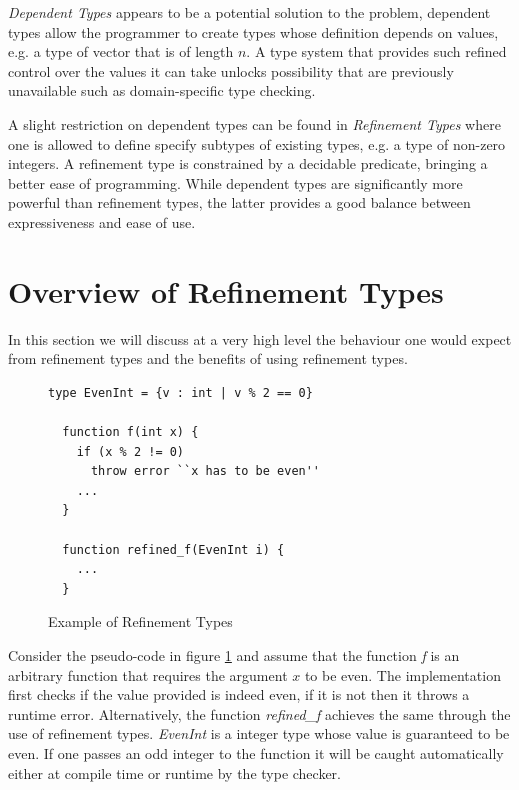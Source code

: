 \documentclass[a4paper,12pt]{report}
\begin{document}
\par
\textit{Dependent Types} \cite{depenTypeAtWork} appears to be a potential solution 
to the problem, dependent types allow the programmer to create types whose 
definition depends on values, e.g. a type of vector that is of length $n$. 
A type system that provides such refined control over the values it 
can take unlocks possibility that are previously unavailable such as 
domain-specific type checking.

\par
A slight restriction on dependent types can be found in \textit{Refinement 
Types} \cite{refinementTypes} where one is allowed to define specify subtypes 
of existing types, e.g. a type of non-zero integers. 
A refinement type is constrained by a decidable predicate, 
bringing a better ease of programming. While dependent types are significantly 
more powerful than refinement types, the latter provides a good balance between 
expressiveness and ease of use.

\section{Overview of Refinement Types}
In this section we will discuss at a very high level the behaviour one would 
expect from refinement types and the benefits of using refinement types. 

\begin{figure}[h] 
  \begin{lstlisting}[mathescape=true] 
  type EvenInt = {v : int | v % 2 == 0}
  
  function f(int x) {
    if (x % 2 != 0) 
      throw error ``x has to be even''
    ...
  }
  
  function refined_f(EvenInt i) {
    ...
  }
  \end{lstlisting}
  \caption{Example of Refinement Types}
  \label{code:refine}
\end{figure}

\par
Consider the pseudo-code in figure \ref{code:refine} and assume that the function 
\textit{f} is an arbitrary function that requires the argument $x$ to be even.
The implementation first checks if the value provided is indeed even, if it 
is not then it throws a runtime error. Alternatively, the function \textit{refined\_f} 
achieves the same through the use of refinement types. \textit{EvenInt} is a 
integer type whose value is guaranteed to be even. If one passes an odd integer 
to the function it will be caught automatically either at compile time or 
runtime by the type checker. 
\end{document}
